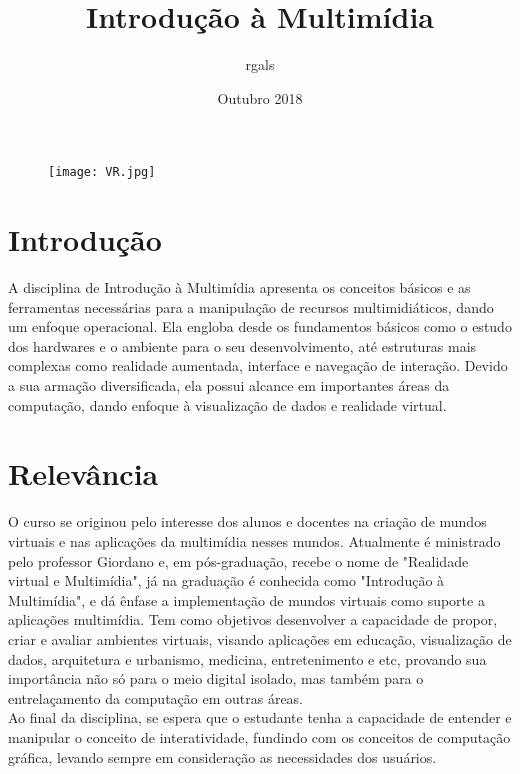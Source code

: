 \documentclass[10pt]{article}
\title{Introdução à Multimídia}
\author{rgals }
\date{Outubro 2018}
\begin{document}
\maketitle
\begin{figure}[h!]
\centering
\texttt{[image: VR.jpg]}

\label{fig:universe}
\end{figure}

\section{Introdução}
A disciplina de Introdução à Multimídia apresenta os conceitos básicos e as ferramentas necessárias para a manipulação de recursos multimidiáticos, dando um enfoque operacional. Ela engloba desde os fundamentos básicos como o estudo dos hardwares e o ambiente para o seu desenvolvimento, até estruturas mais complexas como realidade aumentada, interface e navegação de interação. Devido a sua armação diversificada, ela possui alcance em importantes áreas da computação, dando enfoque à visualização de dados e realidade virtual.\citep{9gag}

\section{Relevância}

O curso se originou pelo interesse dos alunos e docentes na criação de mundos virtuais e nas aplicações da multimídia nesses mundos. Atualmente é ministrado pelo professor Giordano e, em pós-graduação, recebe o nome de "Realidade virtual e Multimídia", já na graduação é conhecida como "Introdução à Multimídia", e dá ênfase a implementação de mundos virtuais como suporte a aplicações multimídia. Tem como objetivos desenvolver a capacidade de propor, criar e avaliar ambientes virtuais, visando aplicações em educação, visualização de dados, arquitetura e urbanismo, medicina, entretenimento e etc, provando sua importância não só para o meio digital isolado, mas também para o  entrelaçamento da computação em outras áreas.\citep{grade}\\
Ao final da disciplina, se espera que o estudante tenha a capacidade de entender e manipular o conceito de interatividade, fundindo com os conceitos de computação gráfica, levando sempre em consideração as necessidades dos usuários. \cite{obj} 
\end{document}
